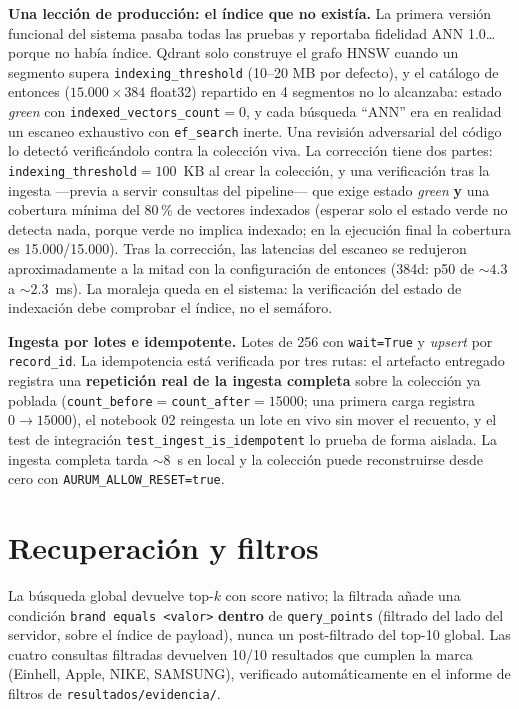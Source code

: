 \documentclass[10pt,twocolumn]{article}
\newcommand{\code}[1]{\texttt{\small #1}}
\begin{document}
\textbf{Una lección de producción: el índice que no existía.} La primera
versión funcional del sistema pasaba todas las pruebas y reportaba fidelidad
ANN 1.0\ldots{} porque no había índice. Qdrant solo construye el grafo HNSW
cuando un segmento supera \code{indexing\_threshold} (10--20 MB por
defecto), y el catálogo de entonces ($15.000 \times 384$ float32) repartido
en 4 segmentos no lo alcanzaba: estado \emph{green} con \code{indexed\_vectors\_count}${=}0$, y
cada búsqueda ``ANN'' era en realidad un escaneo exhaustivo con
\code{ef\_search} inerte. Una revisión adversarial del código lo detectó
verificándolo contra la colección viva. La corrección tiene dos partes:
\code{indexing\_threshold}${=}100$~KB al crear la colección, y una
verificación tras la ingesta ---previa a servir consultas del pipeline--- que
exige estado \emph{green} \textbf{y} una cobertura mínima del 80\,\% de
vectores indexados (esperar solo el estado verde no detecta nada, porque
verde no implica indexado; en la ejecución final la cobertura es
15.000/15.000). Tras la corrección, las latencias del
escaneo se redujeron aproximadamente a la mitad con la configuración de
entonces (384d: p50 de ${\sim}4.3$ a ${\sim}2.3$~ms). La moraleja queda en
el sistema: la verificación del estado de indexación debe comprobar el
índice, no el semáforo.

\textbf{Ingesta por lotes e idempotente.} Lotes de 256 con \code{wait=True}
y \emph{upsert} por \code{record\_id}. La idempotencia está verificada por
tres rutas: el artefacto entregado registra una \textbf{repetición real de
la ingesta completa} sobre la colección ya poblada
(\code{count\_before}${=}$\code{count\_after}${=}15000$; una primera carga
registra $0 \to 15000$), el notebook 02 reingesta un lote en vivo sin mover
el recuento, y el test de integración \code{test\_ingest\_is\_idempotent}
lo prueba de forma aislada. La ingesta completa tarda ${\sim}8$~s en local
y la colección puede reconstruirse desde cero con
\code{AURUM\_ALLOW\_RESET=true}.

\section{Recuperación y filtros}

La búsqueda global devuelve top-$k$ con score nativo; la filtrada añade una
condición \code{brand equals <valor>} \textbf{dentro} de
\code{query\_points} (filtrado del lado del servidor, sobre el índice de
payload), nunca un post-filtrado del top-10 global. Las cuatro consultas
filtradas devuelven 10/10 resultados que cumplen la marca (Einhell, Apple,
NIKE, SAMSUNG), verificado automáticamente en el informe de filtros de
\code{resultados/evidencia/}.
\end{document}
